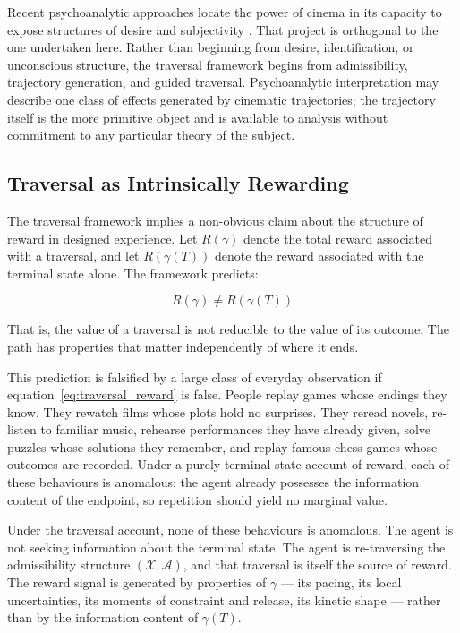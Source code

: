 \documentclass[12pt, a4paper]{article}
\theoremstyle{plain}
\theoremstyle{definition}
\theoremstyle{remark}
\newcommand{\X}{\mathcal{X}}
\newcommand{\A}{\mathcal{A}}
\newcommand{\traj}{\gamma}
\newcommand{\reward}{R}
\begin{document}
Recent psychoanalytic approaches locate the power of cinema
in its capacity to expose structures of desire and
subjectivity \cite{rollins2024}. That project is orthogonal
to the one undertaken here. Rather than beginning from
desire, identification, or unconscious structure, the
traversal framework begins from admissibility, trajectory
generation, and guided traversal. Psychoanalytic
interpretation may describe one class of effects generated
by cinematic trajectories; the trajectory itself is the more
primitive object and is available to analysis without
commitment to any particular theory of the subject.

\subsection{Traversal as Intrinsically Rewarding}
\label{subsec:reward}

The traversal framework implies a non-obvious claim about the
structure of reward in designed experience. Let
$\reward(\traj)$ denote the total reward associated with a
traversal, and let $\reward(\traj(T))$ denote the reward
associated with the terminal state alone. The framework
predicts:

\begin{equation}
  \reward(\traj) \neq \reward(\traj(T))
  \label{eq:traversal_reward}
\end{equation}

That is, the value of a traversal is not reducible to the
value of its outcome. The path has properties that matter
independently of where it ends.

This prediction is falsified by a large class of everyday
observation if equation~\eqref{eq:traversal_reward} is
false. People replay games whose endings they know. They
rewatch films whose plots hold no surprises. They reread
novels, re-listen to familiar music, rehearse performances
they have already given, solve puzzles whose solutions they
remember, and replay famous chess games whose outcomes are
recorded. Under a purely terminal-state account of reward,
each of these behaviours is anomalous: the agent already
possesses the information content of the endpoint, so
repetition should yield no marginal value.

Under the traversal account, none of these behaviours is
anomalous. The agent is not seeking information about the
terminal state. The agent is re-traversing the admissibility
structure $(\X, \A)$, and that traversal is itself the
source of reward. The reward signal is generated by
properties of $\traj$ --- its pacing, its local
uncertainties, its moments of constraint and release, its
kinetic shape --- rather than by the information content of
$\traj(T)$.
\end{document}
